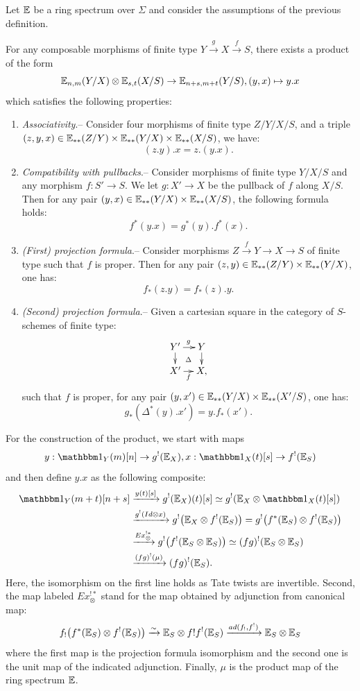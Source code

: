 \begin{prop}\label{prop:biv_product}
Let $\mathbb E$ be a ring spectrum over $\Sigma$ and consider the assumptions of the previous definition.

For any composable morphisms of finite type $Y \xrightarrow g X \xrightarrow f S$,
there exists a product of the form
$$
\mathbb E_{n,m}(Y/X)\otimes \mathbb E_{s,t}(X/S) \rightarrow \mathbb E_{n+s,m+t}(Y/S), (y,x) \mapsto y.x
$$
which satisfies the following properties:
\begin{enumerate}
\item \emph{Associativity}.-- Consider four morphisms of finite type $Z/Y/X/S$,
and a triple $(z,y,x) \in  \mathbb E_{**}(Z/Y) \times \mathbb E_{**}(Y/X) \times \mathbb E_{**}(X/S)$, we have:
$$(z.y).x=z.(y.x).$$
\item \emph{Compatibility with pullbacks}.-- Consider morphisms of finite type $Y/X/S$ and any morphism $f:S' \rightarrow S$.
We let $g:X' \rightarrow X$ be the pullback of $f$ along $X/S$.
Then for any pair $(y,x) \in \mathbb E_{**}(Y/X) \times \mathbb E_{**}(X/S)$, the following formula holds:
$$
f^*(y.x)=g^*(y).f^*(x).
$$
\item \emph{(First) projection formula}.-- Consider morphisms $Z \xrightarrow f Y \rightarrow X \rightarrow S$ of finite type
such that $f$ is proper. Then for any pair $(z,y) \in  \mathbb E_{**}(Z/Y) \times \mathbb E_{**}(Y/X)$, one has:
$$
f_*(z.y)=f_*(z).y.
$$
\item \emph{(Second) projection formula}.-- Given a cartesian square in the category
of $S$-schemes of finite type:
$$
\xymatrix@=10pt{
Y'\ar^g[r]\ar[d]\ar@{}|\Delta[rd] & Y\ar[d] \\
X'\ar_f[r] & X,
}
$$
such that $f$ is proper, for any pair $(y,x') \in \mathbb E_{**}(Y/X) \times \mathbb E_{**}(X'/S)$, one has: 
$$
g_*(\Delta^*(y).x')=y.f_*(x').
$$
\end{enumerate}
\end{prop}
For the construction of the product, we start with maps
$$
y:\un_Y(m)[n] \rightarrow g^!(\E_X), x:\un_X(t)[s] \rightarrow f^!(\E_S)
$$
and then define $y.x$ as the following composite:
\begin{align*}
\un_Y(m+t)[n+s] &\xrightarrow{y(t)[s]} g^!(\E_X)(t)[s] \simeq g^!(\E_X \otimes \un_X(t)[s]) \\
& \xrightarrow{g^!(Id \otimes x)} g^!\big(\E_X \otimes f^!(\E_S)\big)=g^!\big(f^*(\E_S) \otimes f^!(\E_S)\big) \\
& \xrightarrow{Ex^{!*}_\otimes} g^!\big(f^!(\E_S \otimes \E_S)\big) \simeq (fg)^!(\E_S \otimes \E_S) \\
& \xrightarrow{(fg)^!(\mu)} (fg)^!(\E_S).
\end{align*}
Here, the isomorphism on the first line holds as Tate twists are invertible.
Second, the map labeled $Ex_\otimes^{!*}$ stand for the map obtained by adjunction
from canonical map:
$$
f_!\big(f^*(\mathbb E_S) \otimes f^!(\mathbb E_S)\big) \xrightarrow \sim \mathbb E_S \otimes f!f^!(\mathbb E_S) \xrightarrow{ad(f_!,f^!)} \mathbb E_S \otimes \mathbb E_S
$$
where the first map is the projection formula isomorphism and the second one is the unit map of the indicated adjunction.
Finally, $\mu$ is the product map of the ring spectrum $\mathbb E$.

